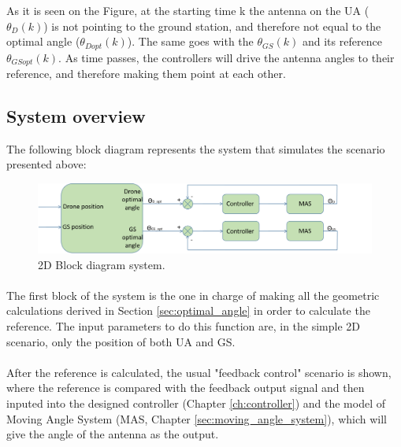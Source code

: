 As it is seen on the Figure, at the starting time k the antenna on the UA ($\theta_{D} (k)$) is not pointing to the ground station, and therefore not equal to the optimal angle ($\theta_{Dopt}(k)$). The same goes with the $\theta_{GS}(k)$ and its reference $\theta_{GSopt}(k)$. As time passes, the controllers will drive the antenna angles to their reference, and therefore making them point at each other. 

\subsection*{System overview}
The following block diagram represents the system that simulates the scenario presented above:
\begin{figure}[H]
	\centering
	\includegraphics[scale=0.50]{figures/2d_system.png}
	\caption{2D Block diagram system.}
	\label{fig:2d_system}
\end{figure}

\paragraph{} The first block of the system is the one in charge of making all the geometric calculations derived in Section \ref{sec:optimal_angle} in order to calculate the reference. The input parameters to do this function are, in the simple 2D scenario, only the position of both UA and GS.

\paragraph{} After the reference is calculated, the usual "feedback control" scenario is shown, where the reference is compared with the feedback output signal and then inputed into the designed controller (Chapter \ref{ch:controller}) and the model of Moving Angle System (MAS, Chapter \ref{sec:moving_angle_system}), which will give the angle of the antenna as the output.


